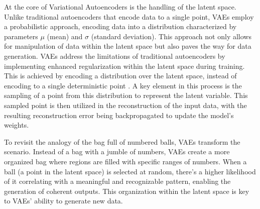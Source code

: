 At the core of Variational Autoencoders is the handling of the latent space. Unlike traditional autoencoders that encode data to a single point, VAEs employ a probabilistic approach, encoding data into a distribution characterized by parameters \(\mu\) (mean) and \(\sigma\) (standard deviation). This approach not only allows for manipulation of data within the latent space but also paves the way for data generation. VAEs address the limitations of traditional autoencoders by implementing enhanced regularization within the latent space during training. This is achieved by encoding a distribution over the latent space, instead of encoding to a single deterministic point \citep{doerschVAE}. A key element in this process is the sampling of a point from this distribution to represent the latent variable. This sampled point is then utilized in the reconstruction of the input data, with the resulting reconstruction error being backpropagated to update the model's weights.

To revisit the analogy of the bag full of numbered balls, VAEs transform the scenario. Instead of a bag with a jumble of numbers, VAEs create a more organized bag where regions are filled with specific ranges of numbers. When a ball (a point in the latent space) is selected at random, there's a higher likelihood of it correlating with a meaningful and recognizable pattern, enabling the generation of coherent outputs. This organization within the latent space is key to VAEs' ability to generate new data.

